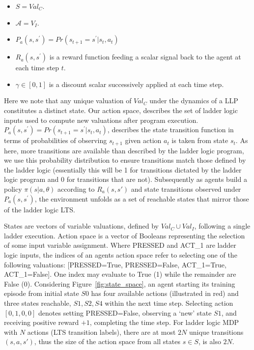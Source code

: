 \documentclass[conference,compsoc]{IEEEtran}
\begin{document}
\begin{itemize}
  \item $S = Val_C$.
  \item $\mathcal{A} = V_I$.
  \item $P_a(s,s^\prime) = Pr(s_{t+1} = s^\prime | s_t, a_t)$
  \item $R_a(s,s^\prime)$ is a reward function feeding a scalar signal back to the agent at each time step $t$. 
  \item $\gamma \in [0,1]$ is a discount scalar successively applied at each time step.
\end{itemize}

Here we note that any unique valuation of $Val_C$ under the dynamics of a LLP constitutes a distinct state. Our action space, describes the set of ladder logic inputs used to compute new valuations after program execution. $P_a(s,s^\prime) = Pr(s_{t+1} = s^\prime | s_t, a_t)$, describes the state transition function in terms of probabilities of observing $s_{t+1}$ given action $a_t$ is taken from state $s_t$. As here, more transitions are available than described by the ladder logic program, we use this probability distribution to ensure transitions match those defined by the ladder logic (essentially this will be 1 for transitions dictated by the ladder logic program and 0 for transitions that are not). 
Subsequently as agents build a policy $\pi(s|a,\theta)$ according to $R_a(s,s')$ and state transitions observed under $P_a(s,s^\prime)$, the environment unfolds as a set of reachable states that mirror those of the ladder logic LTS. 

States are vectors of variable valuations, defined by $Val_C \cup Val_I$, following a single ladder execution. Action space is a vector of Booleans representing the selection of some input variable assignment. Where PRESSED and ACT\_1 are ladder logic inputs, the indices of an agents action space refer to selecting one of the following valuations: [PRESSED=True, PRESSED=False, ACT\_1=True, ACT\_1=False]. One index may evaluate to True (1) while the remainder are False (0). Considering Figure~\ref{fig:state_space}, an agent starting its training episode from initial state $S0$ has four available actions (illustrated in red) and three states reachable, $S1,S2,S4$ within the next time step. Selecting action $[0,1,0,0]$ denotes setting PRESSED=False, observing a `new' state $S1$, and receiving positive reward $+1$, completing the time step. For ladder logic MDP with $N$ actions (LTS transition labels), there are at most $2N$ unique transitions $(s,a,s')$, thus the size of the action space from all states $s \in S$, is also $2N$. 
\end{document}
